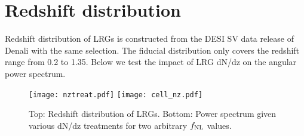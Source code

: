 \section{Redshift distribution}
Redshift distribution of LRGs is constructed from the DESI SV data release of Denali with the same selection. The fiducial distribution only covers the redshift range from 0.2 to 1.35. Below we test the impact of LRG dN/dz on the angular power spectrum.


\begin{figure}
\centering
\texttt{[image: nztreat.pdf]}
\texttt{[image: cell\_nz.pdf]}
\caption{Top: Redshift distribution of LRGs. Bottom: Power spectrum given various dN/dz treatments for two arbitrary $f_{\rm NL}$ values.}
\end{figure}